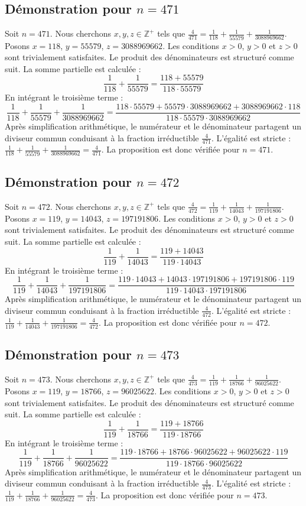 \documentclass[11pt,a4paper]{article}
\begin{document}
\subsection{Démonstration pour $n = 471$}
Soit $n = 471$. Nous cherchons $x, y, z \in \mathbb{Z}^{+}$ tels que $\frac{4}{471} = \frac{1}{118} + \frac{1}{55579} + \frac{1}{3088969662}$.
Posons $x = 118$, $y = 55579$, $z = 3088969662$.
Les conditions $x > 0$, $y > 0$ et $z > 0$ sont trivialement satisfaites.
Le produit des dénominateurs est structuré comme suit. La somme partielle est calculée :
$$ \frac{1}{118} + \frac{1}{55579} = \frac{118+55579}{118 \cdot 55579} $$
En intégrant le troisième terme :
$$ \frac{1}{118} + \frac{1}{55579} + \frac{1}{3088969662} = \frac{118 \cdot 55579 + 55579 \cdot 3088969662 + 3088969662 \cdot 118}{118 \cdot 55579 \cdot 3088969662} $$
Après simplification arithmétique, le numérateur et le dénominateur partagent un diviseur commun conduisant à la fraction irréductible $\frac{4}{471}$.
L'égalité est stricte : $\frac{1}{118} + \frac{1}{55579} + \frac{1}{3088969662} = \frac{4}{471}$.
La proposition est donc vérifiée pour $n = 471$.
\subsection{Démonstration pour $n = 472$}
Soit $n = 472$. Nous cherchons $x, y, z \in \mathbb{Z}^{+}$ tels que $\frac{4}{472} = \frac{1}{119} + \frac{1}{14043} + \frac{1}{197191806}$.
Posons $x = 119$, $y = 14043$, $z = 197191806$.
Les conditions $x > 0$, $y > 0$ et $z > 0$ sont trivialement satisfaites.
Le produit des dénominateurs est structuré comme suit. La somme partielle est calculée :
$$ \frac{1}{119} + \frac{1}{14043} = \frac{119+14043}{119 \cdot 14043} $$
En intégrant le troisième terme :
$$ \frac{1}{119} + \frac{1}{14043} + \frac{1}{197191806} = \frac{119 \cdot 14043 + 14043 \cdot 197191806 + 197191806 \cdot 119}{119 \cdot 14043 \cdot 197191806} $$
Après simplification arithmétique, le numérateur et le dénominateur partagent un diviseur commun conduisant à la fraction irréductible $\frac{4}{472}$.
L'égalité est stricte : $\frac{1}{119} + \frac{1}{14043} + \frac{1}{197191806} = \frac{4}{472}$.
La proposition est donc vérifiée pour $n = 472$.
\subsection{Démonstration pour $n = 473$}
Soit $n = 473$. Nous cherchons $x, y, z \in \mathbb{Z}^{+}$ tels que $\frac{4}{473} = \frac{1}{119} + \frac{1}{18766} + \frac{1}{96025622}$.
Posons $x = 119$, $y = 18766$, $z = 96025622$.
Les conditions $x > 0$, $y > 0$ et $z > 0$ sont trivialement satisfaites.
Le produit des dénominateurs est structuré comme suit. La somme partielle est calculée :
$$ \frac{1}{119} + \frac{1}{18766} = \frac{119+18766}{119 \cdot 18766} $$
En intégrant le troisième terme :
$$ \frac{1}{119} + \frac{1}{18766} + \frac{1}{96025622} = \frac{119 \cdot 18766 + 18766 \cdot 96025622 + 96025622 \cdot 119}{119 \cdot 18766 \cdot 96025622} $$
Après simplification arithmétique, le numérateur et le dénominateur partagent un diviseur commun conduisant à la fraction irréductible $\frac{4}{473}$.
L'égalité est stricte : $\frac{1}{119} + \frac{1}{18766} + \frac{1}{96025622} = \frac{4}{473}$.
La proposition est donc vérifiée pour $n = 473$.
\end{document}
